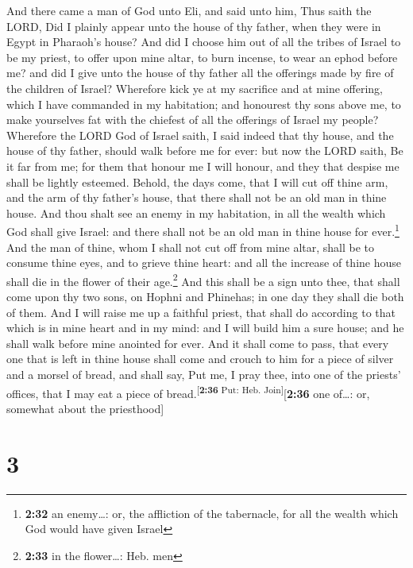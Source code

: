  And there came a man of God unto Eli, and said unto him,
Thus saith the LORD, Did I plainly appear unto the house of thy father,
when they were in Egypt in Pharaoh's house?  And did I
choose him out of all the tribes of Israel to be my priest, to offer
upon mine altar, to burn incense, to wear an ephod before me? and did I
give unto the house of thy father all the offerings made by fire of the
children of Israel?  Wherefore kick ye at my sacrifice
and at mine offering, which I have commanded in my habitation; and
honourest thy sons above me, to make yourselves fat with the chiefest of
all the offerings of Israel my people?  Wherefore the
LORD God of Israel saith, I said indeed that thy house, and the house of
thy father, should walk before me for ever: but now the LORD saith, Be
it far from me; for them that honour me I will honour, and they that
despise me shall be lightly esteemed.  Behold, the days
come, that I will cut off thine arm, and the arm of thy father's house,
that there shall not be an old man in thine house.  And
thou shalt see an enemy in my habitation, in all the wealth which God
shall give Israel: and there shall not be an old man in thine house for
ever.\footnote{\textbf{2:32} an enemy\ldots: or, the affliction of the
  tabernacle, for all the wealth which God would have given Israel}
 And the man of thine, whom I shall not cut off from mine
altar, shall be to consume thine eyes, and to grieve thine heart: and
all the increase of thine house shall die in the flower of their
age.\footnote{\textbf{2:33} in the flower\ldots: Heb. men}
 And this shall be a sign unto thee, that shall come upon
thy two sons, on Hophni and Phinehas; in one day they shall die both of
them.  And I will raise me up a faithful priest, that
shall do according to that which is in mine heart and in my mind: and I
will build him a sure house; and he shall walk before mine anointed for
ever.  And it shall come to pass, that every one that is
left in thine house shall come and crouch to him for a piece of silver
and a morsel of bread, and shall say, Put me, I pray thee, into one of
the priests' offices, that I may eat a piece of
bread.\textsuperscript{{[}\textbf{2:36} Put: Heb.
Join{]}}{[}\textbf{2:36} one of\ldots: or, somewhat about the
priesthood{]}

\hypertarget{section-2}{%
\section{3}\label{section-2}}

